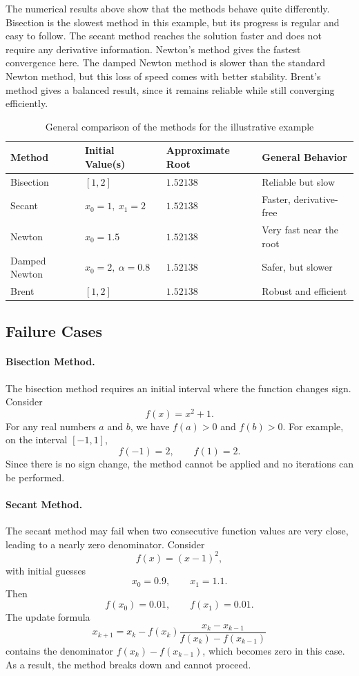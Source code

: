 The numerical results above show that the methods behave quite differently. Bisection is the slowest method in this example, but its progress is regular and easy to follow. The secant method reaches the solution faster and does not require any derivative information. Newton’s method gives the fastest convergence here. The damped Newton method is slower than the standard Newton method, but this loss of speed comes with better stability. Brent’s method gives a balanced result, since it remains reliable while still converging efficiently.

\begin{table}[h!]
\centering
\caption{General comparison of the methods for the illustrative example}
\label{tab:single_example_comparison}
\begin{tabular}{|l|l|l|l|}
\hline
Method & Initial Value(s) & Approximate Root & General Behavior \\ \hline
Bisection & \([1,2]\) & \(1.52138\) & Reliable but slow \\ \hline
Secant & \(x_0=1,\ x_1=2\) & \(1.52138\) & Faster, derivative-free \\ \hline
Newton & \(x_0=1.5\) & \(1.52138\) & Very fast near the root \\ \hline
Damped Newton & \(x_0=2,\ \alpha=0.8\) & \(1.52138\) & Safer, but slower \\ \hline
Brent & \([1,2]\) & \(1.52138\) & Robust and efficient \\ \hline
\end{tabular}
\end{table}

\subsection{Failure Cases}

\paragraph{Bisection Method.}
The bisection method requires an initial interval where the function changes sign. Consider
\[
f(x) = x^2 + 1.
\]
For any real numbers \(a\) and \(b\), we have \(f(a) > 0\) and \(f(b) > 0\). For example, on the interval \([-1, 1]\),
\[
f(-1) = 2, \qquad f(1) = 2.
\]
Since there is no sign change, the method cannot be applied and no iterations can be performed.

\paragraph{Secant Method.}
The secant method may fail when two consecutive function values are very close, leading to a nearly zero denominator. Consider
\[
f(x) = (x - 1)^2,
\]
with initial guesses
\[
x_0 = 0.9, \qquad x_1 = 1.1.
\]
Then
\[
f(x_0) = 0.01, \qquad f(x_1) = 0.01.
\]
The update formula
\[
x_{k+1} = x_k - f(x_k)\frac{x_k - x_{k-1}}{f(x_k) - f(x_{k-1})}
\]
contains the denominator \(f(x_k) - f(x_{k-1})\), which becomes zero in this case. As a result, the method breaks down and cannot proceed.

